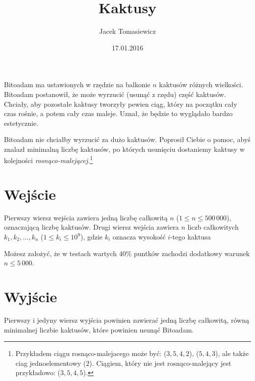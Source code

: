 \documentclass[zad,zawodnik,utf8]{sinol}
\title{Kaktusy}
\author{Jacek Tomasiewicz} %
\date{17.01.2016}
\begin{document}
  \begin{tasktext}%
Bitoadam ma ustawionych w rzędzie na balkonie $n$ kaktusów różnych wielkości. Bitoadam postanowił, że może wyrzucić (usunąć z rzędu) część kaktusów. Chciały, aby pozostałe kaktusy tworzyły pewien ciąg, który na początku cały czas rośnie, a potem cały czas maleje. Uznał, że będzie to wyglądało bardzo estetycznie. 

Bitoadam nie chciałby wyrzucić za dużo kaktusów. Poprosił Ciebie o pomoc, abyś znalazł minimalną liczbę kaktusów, po których usunięciu dostaniemy kaktusy w kolejności \emph{rosnąco-malejącej.}\footnote{Przykładem ciągu rosnąco-malejacego może być: ($3, 5, 4, 2$), ($5, 4, 3$), ale także ciag jednoelementowy ($2$). Ciągiem, który nie jest rosnąco-malejący jest przykładowo: ($3, 5, 4, 5$).}

  \section{Wejście}
	
Pierwszy wiersz wejścia zawiera jedną liczbę całkowitą $n$ ($1 \leq n \leq 500\,000$), oznaczającą liczbę kaktusów.
Drugi wiersz wejścia zawiera $n$ liczb całkowitych $k_1, k_2, \ldots, k_n$ ($1 \leq k_i \leq 10^9$), gdzie $k_i$ oznacza wysokość $i$-tego kaktusa

Możesz założyć, że w testach wartych $40\%$ puntków zachodzi dodatkowy warunek $n \leq 5\,000$.

  \section{Wyjście}
Pierwszy i jedyny wiersz wyjścia powinien zawierać jedną liczbę całkowitą, równą minimalnej liczbie kaktusów, które powinien usunąć Bitoadam.

	\makecompactexample

  \end{tasktext}
\end{document}
